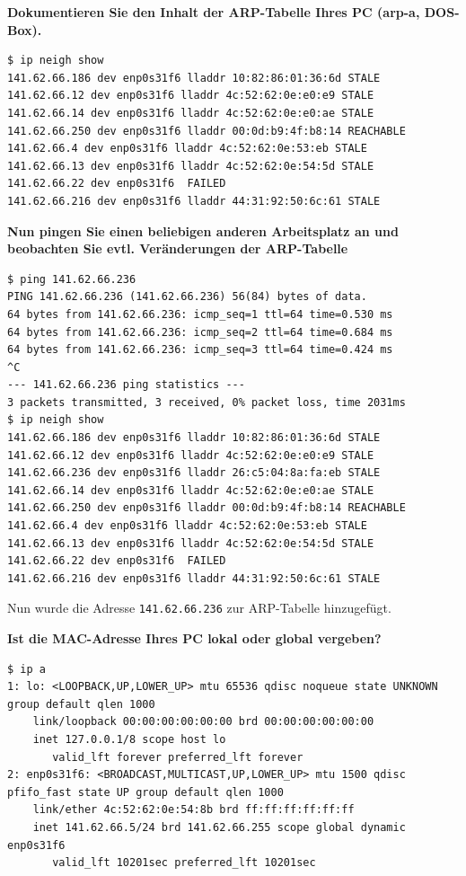 \textbf{Dokumentieren Sie den Inhalt der ARP-Tabelle Ihres PC (arp-a,
DOS-Box).}

\begin{verbatim}
$ ip neigh show
141.62.66.186 dev enp0s31f6 lladdr 10:82:86:01:36:6d STALE
141.62.66.12 dev enp0s31f6 lladdr 4c:52:62:0e:e0:e9 STALE
141.62.66.14 dev enp0s31f6 lladdr 4c:52:62:0e:e0:ae STALE
141.62.66.250 dev enp0s31f6 lladdr 00:0d:b9:4f:b8:14 REACHABLE
141.62.66.4 dev enp0s31f6 lladdr 4c:52:62:0e:53:eb STALE
141.62.66.13 dev enp0s31f6 lladdr 4c:52:62:0e:54:5d STALE
141.62.66.22 dev enp0s31f6  FAILED
141.62.66.216 dev enp0s31f6 lladdr 44:31:92:50:6c:61 STALE
\end{verbatim}

\textbf{Nun pingen Sie einen beliebigen anderen Arbeitsplatz an und
beobachten Sie evtl. Veränderungen der ARP-Tabelle}

\begin{verbatim}
$ ping 141.62.66.236
PING 141.62.66.236 (141.62.66.236) 56(84) bytes of data.
64 bytes from 141.62.66.236: icmp_seq=1 ttl=64 time=0.530 ms
64 bytes from 141.62.66.236: icmp_seq=2 ttl=64 time=0.684 ms
64 bytes from 141.62.66.236: icmp_seq=3 ttl=64 time=0.424 ms
^C
--- 141.62.66.236 ping statistics ---
3 packets transmitted, 3 received, 0% packet loss, time 2031ms
$ ip neigh show
141.62.66.186 dev enp0s31f6 lladdr 10:82:86:01:36:6d STALE
141.62.66.12 dev enp0s31f6 lladdr 4c:52:62:0e:e0:e9 STALE
141.62.66.236 dev enp0s31f6 lladdr 26:c5:04:8a:fa:eb STALE
141.62.66.14 dev enp0s31f6 lladdr 4c:52:62:0e:e0:ae STALE
141.62.66.250 dev enp0s31f6 lladdr 00:0d:b9:4f:b8:14 REACHABLE
141.62.66.4 dev enp0s31f6 lladdr 4c:52:62:0e:53:eb STALE
141.62.66.13 dev enp0s31f6 lladdr 4c:52:62:0e:54:5d STALE
141.62.66.22 dev enp0s31f6  FAILED
141.62.66.216 dev enp0s31f6 lladdr 44:31:92:50:6c:61 STALE
\end{verbatim}

Nun wurde die Adresse \texttt{141.62.66.236} zur ARP-Tabelle
hinzugefügt.

\textbf{Ist die MAC-Adresse Ihres PC lokal oder global vergeben?}

\begin{verbatim}
$ ip a
1: lo: <LOOPBACK,UP,LOWER_UP> mtu 65536 qdisc noqueue state UNKNOWN group default qlen 1000
    link/loopback 00:00:00:00:00:00 brd 00:00:00:00:00:00
    inet 127.0.0.1/8 scope host lo
       valid_lft forever preferred_lft forever
2: enp0s31f6: <BROADCAST,MULTICAST,UP,LOWER_UP> mtu 1500 qdisc pfifo_fast state UP group default qlen 1000
    link/ether 4c:52:62:0e:54:8b brd ff:ff:ff:ff:ff:ff
    inet 141.62.66.5/24 brd 141.62.66.255 scope global dynamic enp0s31f6
       valid_lft 10201sec preferred_lft 10201sec
\end{verbatim}

